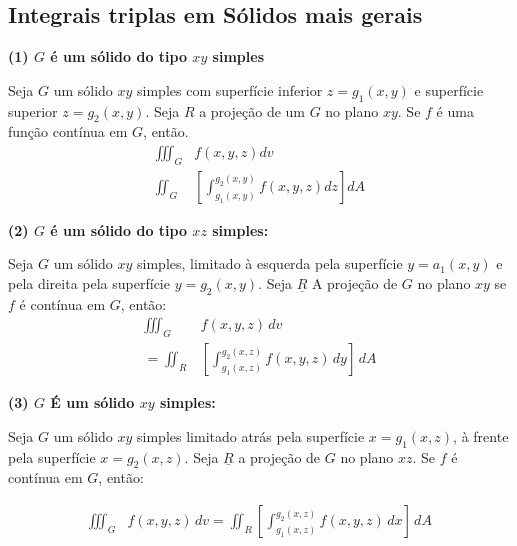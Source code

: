 \documentclass[portugues, 11pt]{article}
\begin{document}
	\subsection{Integrais triplas em Sólidos mais gerais}
	
	\textbf{(1) $G$ é um sólido do tipo $xy$ simples}
	\begin{thrm}
		Seja $G$ um sólido $xy$ simples com superfície inferior $z=g_1(x,y)$ e superfície superior $z=g_2(x,y)$. Seja $R$ a projeção de um $G$ no plano $xy$. Se $f$ é uma função contínua em $G$, então.
		\begin{align*}
		\iiint_G & {f(x,y,z)}{dv}
		\\
		\iint_G  & [\int_{g_1 (x,y)}^{g_2 (x,y)} {f(x,y,z)}{dz} ] {dA}
		\end{align*}
	\end{thrm}
	
	\textbf{(2) $G$ é um sólido do tipo $xz$ simples: }
	\begin{thrm}
		Seja $G$ um sólido $xy$ simples, limitado à esquerda pela superfície $y=a_1 (x,y)$ e pela direita pela superfície $y=g_2 (x,y)$. Seja $\underline{R}$ A projeção de $G$ no plano $xy$ se $f$ é contínua em $G$, então: 
		\begin{align*}
			\iiint_G & {f(x,y,z)} \,dv \\
			= \iint_R & \left[ \int_{g_1(x,z)}^{g_2(x,z)}	f(x,y,z) \,dy \right ] \,dA 
		\end{align*}
	\end{thrm}


	\textbf{(3) $G$ É um sólido $xy$ simples:}
	\begin{thrm}
		Seja $G$ um sólido $xy$ simples limitado atrás pela superfície $x=g_1(x,z)$, à frente pela superfície $x=g_2(x,z)$.
		Seja $\underline{R}$ a projeção de $G$ no plano $xz$. Se $f$ é contínua em $G$, então:
		
		\begin{align*}
			\iiint_G & f(x,y,z) \,dv
			= \iint_R \left [ \int_{g_1(x,z)}^{g_2(x,z)} f(x,y,z) \,dx \right ] \,dA
		\end{align*}
	\end{thrm}
	
\end{document}
